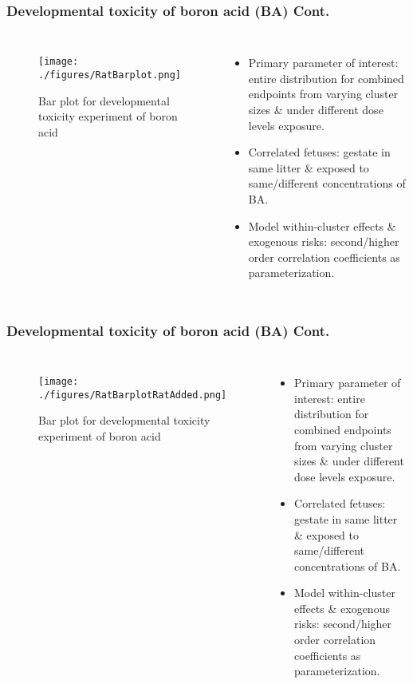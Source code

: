 \documentclass[hyperref={bookmarks=false},aspectratio=169]{beamer}
\begin{document}
\begin{frame}
\frametitle{Developmental toxicity of boron acid (BA) Cont.}

\begin{columns}


\begin{figure}
    \centering
    \texttt{[image: ./figures/RatBarplot.png]}
    \caption{Bar plot for developmental toxicity experiment of boron acid}
    \label{fig:ratExperimentBarplot}
\end{figure}

\begin{itemize}
    \item Primary parameter of interest: entire distribution for combined endpoints from varying cluster sizes {\&} under different dose levels exposure.
    \item Correlated fetuses: gestate in same litter {\&} exposed to same/different concentrations of BA.
    \item Model within-cluster effects {\&} exogenous risks: second/higher order correlation coefficients as parameterization.
\end{itemize}

\end{columns}
\end{frame}

\begin{frame}
\frametitle{Developmental toxicity of boron acid (BA) Cont.}

\begin{columns}


\begin{figure}
    \centering
    \texttt{[image: ./figures/RatBarplotRatAdded.png]}
    \caption{Bar plot for developmental toxicity experiment of boron acid}
    \label{fig:ratExperimentBarplotRatAdded}
\end{figure}

\begin{itemize}
    \item Primary parameter of interest: entire distribution for combined endpoints from varying cluster sizes {\&} under different dose levels exposure.
    \item Correlated fetuses: gestate in same litter {\&} exposed to same/different concentrations of BA.
    \item Model within-cluster effects {\&} exogenous risks: second/higher order correlation coefficients as parameterization.
\end{itemize}

\end{columns}
\end{frame}
\end{document}

